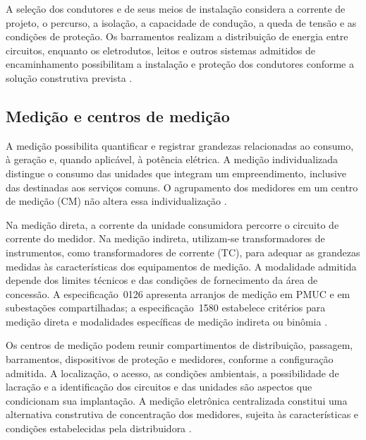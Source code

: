 A seleção dos condutores e de seus meios de instalação considera a corrente de projeto, o percurso, a isolação, a capacidade de condução, a queda de tensão e as condições de proteção. Os barramentos realizam a distribuição de energia entre circuitos, enquanto os eletrodutos, leitos e outros sistemas admitidos de encaminhamento possibilitam a instalação e proteção dos condutores conforme a solução construtiva prevista \cite[seção~7.6]{enel0126}\cite[seção~7.19]{enel1580}\cite[seção~6.2]{abnt5410}.

\subsection{Medição e centros de medição}

A medição possibilita quantificar e registrar grandezas relacionadas ao consumo, à geração e, quando aplicável, à potência elétrica. A medição individualizada distingue o consumo das unidades que integram um empreendimento, inclusive das destinadas aos serviços comuns. O agrupamento dos medidores em um centro de medição (CM) não altera essa individualização \cite[itens~7.1.4 e~7.7.1]{enel0126}\cite[seções~6 e~7.18]{enel1580}.

Na medição direta, a corrente da unidade consumidora percorre o circuito de corrente do medidor. Na medição indireta, utilizam-se transformadores de instrumentos, como transformadores de corrente (TC), para adequar as grandezas medidas às características dos equipamentos de medição. A modalidade admitida depende dos limites técnicos e das condições de fornecimento da área de concessão. A especificação~0126 apresenta arranjos de medição em PMUC e em subestações compartilhadas; a especificação~1580 estabelece critérios para medição direta e modalidades específicas de medição indireta ou binômia \cite[itens~7.7.1 a~7.7.3]{enel0126}\cite[itens~7.17.1 a~7.17.3]{enel1580}.

Os centros de medição podem reunir compartimentos de distribuição, passagem, barramentos, dispositivos de proteção e medidores, conforme a configuração admitida. A localização, o acesso, as condições ambientais, a possibilidade de lacração e a identificação dos circuitos e das unidades são aspectos que condicionam sua implantação. A medição eletrônica centralizada constitui uma alternativa construtiva de concentração dos medidores, sujeita às características e condições estabelecidas pela distribuidora \cite[itens~7.7.2, 7.7.4 e~7.7.5]{enel0126}\cite[seções~7.14 e~7.17 a~7.23]{enel1580}.

